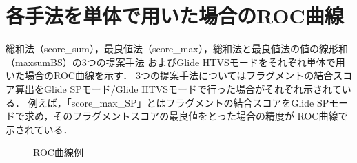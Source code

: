 \chapter{各手法を単体で用いた場合のROC曲線}\label{appendix:roc}
総和法（score\_sum），最良値法（score\_max），総和法と最良値法の値の線形和（maxsumBS）の3つの提案手法
およびGlide HTVSモードをそれぞれ単体で用いた場合のROC曲線を示す．
3つの提案手法についてはフラグメントの結合スコア算出をGlide SPモード/Glide HTVSモードで行った場合がそれぞれ示されている．
例えば，「score\_max\_SP」とはフラグメントの結合スコアをGlide SPモードで求め，そのフラグメントスコアの最良値をとった場合の精度が
ROC曲線で示されている．
\begin{figure}[tb]
 \begin{minipage}{0.5\hsize}
  \begin{center}
  \end{center}
 \end{minipage}
 \begin{minipage}{0.5\hsize}
  \begin{center}
  \end{center}
 \end{minipage}
 \begin{minipage}{0.5\hsize}
  \begin{center}
  \end{center}
 \end{minipage}
 \begin{minipage}{0.5\hsize}
  \begin{center}
  \end{center}
 \end{minipage}
 \begin{minipage}{0.5\hsize}
  \begin{center}
  \end{center}
 \end{minipage}
 \begin{minipage}{0.5\hsize}
  \begin{center}
  \end{center}
 \end{minipage}
  \caption{ROC曲線例}
  \label{fig:roc:1}
\end{figure}
